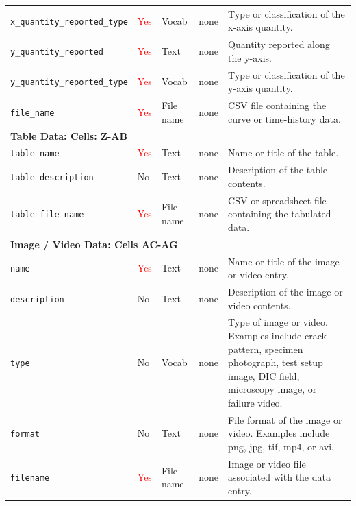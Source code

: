 \documentclass[11pt]{book}
\begin{document}
\begin{longtable}{p{}p{}p{}p{}p{}}
\texttt{x\_quantity\_reported\_type} &
\textcolor{red}{Yes} &
Vocab &
none &
Type or classification of the x-axis quantity. \\

\texttt{y\_quantity\_reported} &
\textcolor{red}{Yes} &
Text &
none &
Quantity reported along the y-axis. \\

\texttt{y\_quantity\_reported\_type} &
\textcolor{red}{Yes} &
Vocab &
none &
Type or classification of the y-axis quantity. \\

\texttt{file\_name} &
\textcolor{red}{Yes} &
File name &
none &
CSV file containing the curve or time-history data. \\

\hline
\multicolumn{5}{l}{\textbf{Table Data: Cells: Z-AB}} \\
\hline

\texttt{table\_name} &
\textcolor{red}{Yes} &
Text &
none &
Name or title of the table. \\

\texttt{table\_description} &
No &
Text &
none &
Description of the table contents. \\

\texttt{table\_file\_name} &
\textcolor{red}{Yes} &
File name &
none &
CSV or spreadsheet file containing the tabulated data. \\

\hline
\multicolumn{5}{l}{\textbf{Image / Video Data: Cells AC-AG}} \\
\hline

\texttt{name} &
\textcolor{red}{Yes} &
Text &
none &
Name or title of the image or video entry. \\

\texttt{description} &
No &
Text &
none &
Description of the image or video contents. \\

\texttt{type} &
No &
Vocab &
none &
Type of image or video. Examples include crack pattern, specimen photograph,
test setup image, DIC field, microscopy image, or failure video. \\

\texttt{format} &
No &
Text &
none &
File format of the image or video. Examples include png, jpg, tif, mp4, or avi. \\

\texttt{filename} &
\textcolor{red}{Yes} &
File name &
none &
Image or video file associated with the data entry. \\

\hline

\end{longtable}
\end{document}
